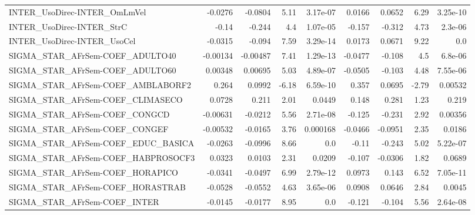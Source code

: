 \begin{tabular}{lrrrrrrrr}
INTER\_UsoDirec-INTER\_OmLmVel           &     -0.0276 &      -0.0804 &    5.11 & 3.17e-07 &     0.0166 &      0.0652 &         6.29 &      3.25e-10 \\
INTER\_UsoDirec-INTER\_StrC              &       -0.14 &       -0.244 &     4.4 & 1.07e-05 &     -0.157 &      -0.312 &         4.73 &       2.3e-06 \\
INTER\_UsoDirec-INTER\_UsoCel            &     -0.0315 &       -0.094 &    7.59 & 3.29e-14 &     0.0173 &      0.0671 &         9.22 &           0.0 \\
SIGMA\_STAR\_AFrSem-COEF\_ADULTO40        &    -0.00134 &     -0.00487 &    7.41 & 1.29e-13 &    -0.0477 &      -0.108 &          4.5 &       6.8e-06 \\
SIGMA\_STAR\_AFrSem-COEF\_ADULTO60        &     0.00348 &      0.00695 &    5.03 & 4.89e-07 &    -0.0505 &      -0.103 &         4.48 &      7.55e-06 \\
SIGMA\_STAR\_AFrSem-COEF\_AMBLABORF2      &       0.264 &       0.0992 &   -6.18 & 6.59e-10 &      0.357 &      0.0695 &        -2.79 &       0.00532 \\
SIGMA\_STAR\_AFrSem-COEF\_CLIMASECO       &      0.0728 &        0.211 &    2.01 &   0.0449 &      0.148 &       0.281 &         1.23 &         0.219 \\
SIGMA\_STAR\_AFrSem-COEF\_CONGCD          &    -0.00631 &      -0.0212 &    5.56 & 2.71e-08 &     -0.125 &      -0.231 &         2.92 &       0.00356 \\
SIGMA\_STAR\_AFrSem-COEF\_CONGEF          &    -0.00532 &      -0.0165 &    3.76 & 0.000168 &    -0.0466 &     -0.0951 &         2.35 &        0.0186 \\
SIGMA\_STAR\_AFrSem-COEF\_EDUC\_BASICA     &     -0.0263 &      -0.0996 &    8.66 &      0.0 &      -0.11 &      -0.243 &         5.02 &      5.22e-07 \\
SIGMA\_STAR\_AFrSem-COEF\_HABPROSOCF3     &      0.0323 &       0.0103 &    2.31 &   0.0209 &     -0.107 &     -0.0306 &         1.82 &        0.0689 \\
SIGMA\_STAR\_AFrSem-COEF\_HORAPICO        &     -0.0341 &      -0.0497 &    6.99 & 2.79e-12 &     0.0973 &       0.143 &         6.52 &      7.05e-11 \\
SIGMA\_STAR\_AFrSem-COEF\_HORASTRAB       &     -0.0528 &      -0.0552 &    4.63 & 3.65e-06 &     0.0908 &      0.0646 &         2.84 &        0.0045 \\
SIGMA\_STAR\_AFrSem-COEF\_INTER           &     -0.0145 &      -0.0177 &    8.95 &      0.0 &     -0.121 &      -0.104 &         5.56 &      2.64e-08 \\

\end{tabular}
